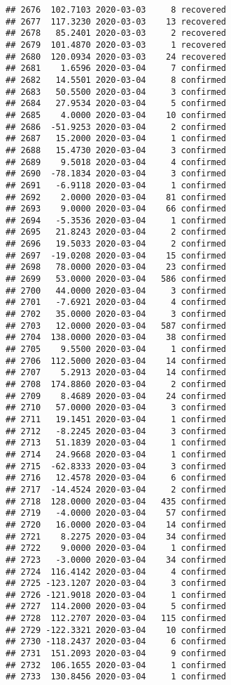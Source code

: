 \documentclass[
]{article}
\begin{document}
\begin{verbatim}
## 2676  102.7103 2020-03-03     8 recovered
## 2677  117.3230 2020-03-03    13 recovered
## 2678   85.2401 2020-03-03     2 recovered
## 2679  101.4870 2020-03-03     1 recovered
## 2680  120.0934 2020-03-03    24 recovered
## 2681    1.6596 2020-03-04     7 confirmed
## 2682   14.5501 2020-03-04     8 confirmed
## 2683   50.5500 2020-03-04     3 confirmed
## 2684   27.9534 2020-03-04     5 confirmed
## 2685    4.0000 2020-03-04    10 confirmed
## 2686  -51.9253 2020-03-04     2 confirmed
## 2687   15.2000 2020-03-04     1 confirmed
## 2688   15.4730 2020-03-04     3 confirmed
## 2689    9.5018 2020-03-04     4 confirmed
## 2690  -78.1834 2020-03-04     3 confirmed
## 2691   -6.9118 2020-03-04     1 confirmed
## 2692    2.0000 2020-03-04    81 confirmed
## 2693    9.0000 2020-03-04    66 confirmed
## 2694   -5.3536 2020-03-04     1 confirmed
## 2695   21.8243 2020-03-04     2 confirmed
## 2696   19.5033 2020-03-04     2 confirmed
## 2697  -19.0208 2020-03-04    15 confirmed
## 2698   78.0000 2020-03-04    23 confirmed
## 2699   53.0000 2020-03-04   586 confirmed
## 2700   44.0000 2020-03-04     3 confirmed
## 2701   -7.6921 2020-03-04     4 confirmed
## 2702   35.0000 2020-03-04     3 confirmed
## 2703   12.0000 2020-03-04   587 confirmed
## 2704  138.0000 2020-03-04    38 confirmed
## 2705    9.5500 2020-03-04     1 confirmed
## 2706  112.5000 2020-03-04    14 confirmed
## 2707    5.2913 2020-03-04    14 confirmed
## 2708  174.8860 2020-03-04     2 confirmed
## 2709    8.4689 2020-03-04    24 confirmed
## 2710   57.0000 2020-03-04     3 confirmed
## 2711   19.1451 2020-03-04     1 confirmed
## 2712   -8.2245 2020-03-04     3 confirmed
## 2713   51.1839 2020-03-04     1 confirmed
## 2714   24.9668 2020-03-04     1 confirmed
## 2715  -62.8333 2020-03-04     3 confirmed
## 2716   12.4578 2020-03-04     6 confirmed
## 2717  -14.4524 2020-03-04     2 confirmed
## 2718  128.0000 2020-03-04   435 confirmed
## 2719   -4.0000 2020-03-04    57 confirmed
## 2720   16.0000 2020-03-04    14 confirmed
## 2721    8.2275 2020-03-04    34 confirmed
## 2722    9.0000 2020-03-04     1 confirmed
## 2723   -3.0000 2020-03-04    34 confirmed
## 2724  116.4142 2020-03-04     4 confirmed
## 2725 -123.1207 2020-03-04     3 confirmed
## 2726 -121.9018 2020-03-04     1 confirmed
## 2727  114.2000 2020-03-04     5 confirmed
## 2728  112.2707 2020-03-04   115 confirmed
## 2729 -122.3321 2020-03-04    10 confirmed
## 2730 -118.2437 2020-03-04     6 confirmed
## 2731  151.2093 2020-03-04     9 confirmed
## 2732  106.1655 2020-03-04     1 confirmed
## 2733  130.8456 2020-03-04     1 confirmed

\end{verbatim}
\end{document}

